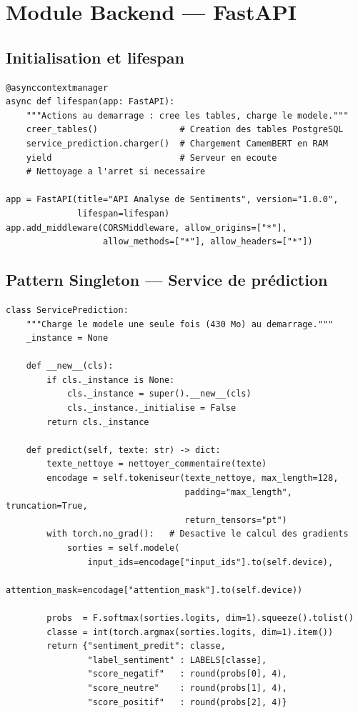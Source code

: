 \documentclass[12pt,a4paper,oneside]{report}
\begin{document}
\section{Module Backend --- FastAPI}

\subsection{Initialisation et lifespan}

\begin{lstlisting}[style=stylePython,caption={Initialisation FastAPI avec lifespan},label={lst:fastapi}]
@asynccontextmanager
async def lifespan(app: FastAPI):
    """Actions au demarrage : cree les tables, charge le modele."""
    creer_tables()                # Creation des tables PostgreSQL
    service_prediction.charger()  # Chargement CamemBERT en RAM
    yield                         # Serveur en ecoute
    # Nettoyage a l'arret si necessaire

app = FastAPI(title="API Analyse de Sentiments", version="1.0.0",
              lifespan=lifespan)
app.add_middleware(CORSMiddleware, allow_origins=["*"],
                   allow_methods=["*"], allow_headers=["*"])
\end{lstlisting}

\subsection{Pattern Singleton — Service de prédiction}

\begin{lstlisting}[style=stylePython,caption={Singleton ServicePrediction},label={lst:singleton}]
class ServicePrediction:
    """Charge le modele une seule fois (430 Mo) au demarrage."""
    _instance = None

    def __new__(cls):
        if cls._instance is None:
            cls._instance = super().__new__(cls)
            cls._instance._initialise = False
        return cls._instance

    def predict(self, texte: str) -> dict:
        texte_nettoye = nettoyer_commentaire(texte)
        encodage = self.tokeniseur(texte_nettoye, max_length=128,
                                   padding="max_length", truncation=True,
                                   return_tensors="pt")
        with torch.no_grad():   # Desactive le calcul des gradients
            sorties = self.modele(
                input_ids=encodage["input_ids"].to(self.device),
                attention_mask=encodage["attention_mask"].to(self.device))

        probs  = F.softmax(sorties.logits, dim=1).squeeze().tolist()
        classe = int(torch.argmax(sorties.logits, dim=1).item())
        return {"sentiment_predit": classe,
                "label_sentiment" : LABELS[classe],
                "score_negatif"   : round(probs[0], 4),
                "score_neutre"    : round(probs[1], 4),
                "score_positif"   : round(probs[2], 4)}
\end{lstlisting}
\end{document}
